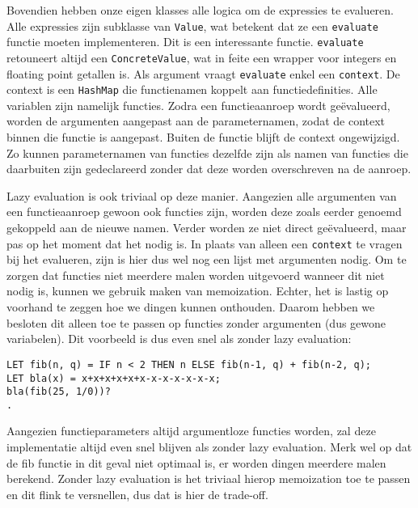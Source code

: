 \documentclass[11pt]{article}
\begin{document}
Bovendien hebben onze eigen klasses alle logica om de expressies te evalueren. Alle expressies zijn subklasse van \verb+Value+, wat betekent dat ze een \verb+evaluate+ functie moeten implementeren. Dit is een interessante functie. \verb+evaluate+ retouneert altijd een \verb+ConcreteValue+, wat in feite een wrapper voor integers en floating point getallen is. Als argument vraagt \verb+evaluate+ enkel een \verb+context+. De context is een \verb+HashMap+ die functienamen koppelt aan functiedefinities. Alle variablen zijn namelijk functies. Zodra een functieaanroep wordt ge\"evalueerd, worden de argumenten aangepast aan de parameternamen, zodat de context binnen die functie is aangepast. Buiten de functie blijft de context ongewijzigd. Zo kunnen parameternamen van functies dezelfde zijn als namen van functies die daarbuiten zijn gedeclareerd zonder dat deze worden overschreven na de aanroep.

Lazy evaluation is ook triviaal op deze manier. Aangezien alle argumenten van een functieaanroep gewoon ook functies zijn, worden deze zoals eerder genoemd gekoppeld aan de nieuwe namen. Verder worden ze niet direct ge\"evalueerd, maar pas op het moment dat het nodig is. In plaats van alleen een \verb+context+ te vragen bij het evalueren, zijn is hier dus wel nog een lijst met argumenten nodig. Om te zorgen dat functies niet meerdere malen worden uitgevoerd wanneer dit niet nodig is, kunnen we gebruik maken van memoization. Echter, het is lastig op voorhand te zeggen hoe we dingen kunnen onthouden. Daarom hebben we besloten dit alleen toe te passen op functies zonder argumenten (dus gewone variabelen). Dit voorbeeld is dus even snel als zonder lazy evaluation:

\begin{verbatim}
LET fib(n, q) = IF n < 2 THEN n ELSE fib(n-1, q) + fib(n-2, q);
LET bla(x) = x+x+x+x+x+x-x-x-x-x-x-x;
bla(fib(25, 1/0))?
.
\end{verbatim}

Aangezien functieparameters altijd argumentloze functies worden, zal deze implementatie altijd even snel blijven als zonder lazy evaluation. Merk wel op dat de fib functie in dit geval niet optimaal is, er worden dingen meerdere malen berekend. Zonder lazy evaluation is het triviaal hierop memoization toe te passen en dit flink te versnellen, dus dat is hier de trade-off.
\end{document}
